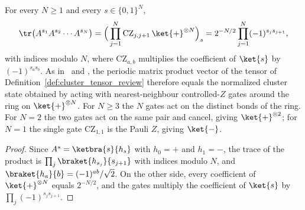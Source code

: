 \begin{lemma}\label{thm:cluster_cz_construction}
    \leanok
    For every $N \geq 1$ and every $s \in \{0,1\}^N$,
    \begin{align}
        \tr\bigl(A^{s_1} A^{s_2} \cdots A^{s_N}\bigr)
        = \Bigl(\,\prod_{j=1}^{N} \mathrm{CZ}_{j,j+1}\,
        \ket{+}^{\otimes N}\Bigr)_{s}
        = 2^{-N/2} \prod_{j=1}^{N} (-1)^{s_j s_{j+1}},
        \notag
    \end{align}
    with indices modulo $N$, where $\mathrm{CZ}_{a,b}$ multiplies the
    coefficient of $\ket{s}$ by $(-1)^{s_a s_b}$. As
    in~\cite[Appendix~A, ``The cluster state'']{Cirac2021Matrix} and
    \cite{RaussendorfBriegel2001}, the periodic matrix product vector of the
    tensor of Definition~\ref{def:cluster_tensor_review} therefore equals the
    normalized cluster state obtained by acting with nearest-neighbour
    controlled-$Z$ gates around the ring on $\ket{+}^{\otimes N}$. For
    $N \geq 3$ the $N$ gates act on the
    distinct bonds of the ring. For $N = 2$ the two gates act on the same pair
    and cancel, giving $\ket{+}^{\otimes 2}$; for $N = 1$ the single gate
    $\mathrm{CZ}_{1,1}$ is the Pauli $Z$, giving $\ket{-}$.
\end{lemma}

\begin{proof}
    \leanok
    Since $A^s = \ketbra{s}{h_s}$ with $h_0 = +$ and $h_1 = -$, the trace of
    the product is $\prod_j \braket{h_{s_j}}{s_{j+1}}$ with indices modulo
    $N$, and $\braket{h_a}{b} = (-1)^{ab}/\sqrt{2}$. On the other side,
    every coefficient of $\ket{+}^{\otimes N}$ equals $2^{-N/2}$, and the
    gates multiply the coefficient of $\ket{s}$ by
    $\prod_j (-1)^{s_j s_{j+1}}$.
\end{proof}


